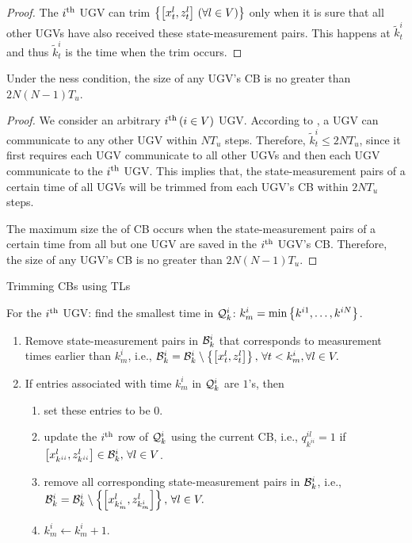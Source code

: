 	\begin{proof}
		The $i^\text{th}$ UGV can trim $\left\lbrace\left[x^l_t,z^l_t\right] \,(\forall l\in V)\right\rbrace$ only when it is sure that all other UGVs have also received these state-measurement pairs.
		This happens at $\tilde{k}^i_t$ and thus $\tilde{k}^i_t$ is the time when the trim occurs. 
	\end{proof}
	
	\begin{cor}\label{thm:max_CB_size}
		Under the \fc ness condition, the size of any UGV's CB is no greater than $2N(N-1)T_u$.
	\end{cor}
	
	\begin{proof}
		We consider an arbitrary $i^\text{th}\,(i\in V)$ UGV.
		According to , a UGV can communicate to any other UGV within $NT_u$ steps.
		Therefore, $\tilde{k}^i_t\le 2NT_u$, since it first requires each UGV communicate to all other UGVs and then each UGV communicate to the $i^\text{th}$ UGV.
		This implies that, the state-measurement pairs of a certain time of all UGVs will be trimmed from each UGV's CB within $2NT_u$ steps.

		The maximum size the of CB occurs when the state-measurement pairs of a certain time from all but one UGV are saved in the $i^\text{th}$ UGV's CB.
		Therefore, the size of any UGV's CB is no greater than $2N(N-1)T_u$.		
		
	\end{proof}
	
	
	\begin{algorithm}
		\caption{Trimming CBs using TLs}
		\label{alg:tracklist}
		\begin{algorithmic}
			\State 
			For the $i^\text{th}$ UGV:			
			find the smallest time in $\mathcal{Q}^i_k$: $k^i_m=\min\left\lbrace k^{i1},\dots,k^{iN} \right\rbrace$. 
			\begin{enumerate}
				\item Remove state-measurement pairs in $\mathcal{B}^i_k$ that corresponds to measurement times earlier than $k^i_m$, i.e., $\mathcal{B}^i_k=\mathcal{B}^i_k\setminus \left\lbrace\left[x^l_t,z^l_t\right] \right\rbrace,\,\forall t< k^i_m, \forall l\in V.$
				\item If entries associated with time $k^i_m$ in $\mathcal{Q}^i_k$ are $1$'s, then 
				\begin{enumerate}
					\item set these entries to be $0$.
					\item update the $i^\text{th}$ row of $\mathcal{Q}^i_k$ using the current CB, \textcolor{\revcol}{i.e., $q^{il}_{k^{ii}}=1$ if $\left[x^l_{k^{ii}},z^l_{k^{ii}}\right]\in \mathcal{B}^i_k,\,\forall l\in V$.}
					\item remove all corresponding state-measurement pairs in $\mathcal{B}^i_k$, i.e., $\mathcal{B}^i_k=\mathcal{B}^i_k\setminus \left\lbrace\left[x^l_{k^i_m},z^l_{k^i_m}\right] \right\rbrace,\, \forall l\in V.$
					\item $k^i_m \leftarrow k^i_m+1.$
				\end{enumerate}	
			\end{enumerate}				
		\end{algorithmic}
	\end{algorithm}
	

